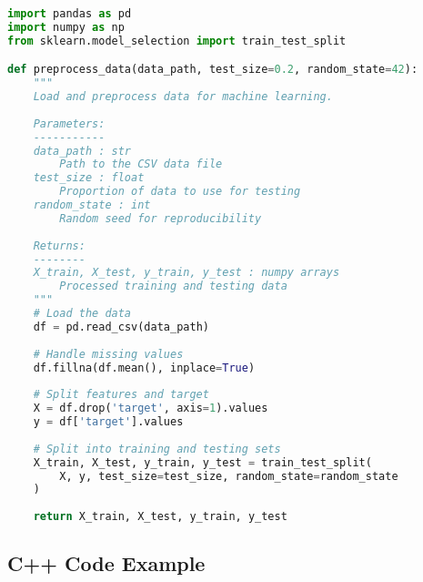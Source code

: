 \documentclass[a4paper,11pt]{article}
\begin{document}
\begin{lstlisting}[language=Python, caption=Data Processing in Python, label=lst:python]
import pandas as pd
import numpy as np
from sklearn.model_selection import train_test_split

def preprocess_data(data_path, test_size=0.2, random_state=42):
    """
    Load and preprocess data for machine learning.
    
    Parameters:
    -----------
    data_path : str
        Path to the CSV data file
    test_size : float
        Proportion of data to use for testing
    random_state : int
        Random seed for reproducibility
        
    Returns:
    --------
    X_train, X_test, y_train, y_test : numpy arrays
        Processed training and testing data
    """
    # Load the data
    df = pd.read_csv(data_path)
    
    # Handle missing values
    df.fillna(df.mean(), inplace=True)
    
    # Split features and target
    X = df.drop('target', axis=1).values
    y = df['target'].values
    
    # Split into training and testing sets
    X_train, X_test, y_train, y_test = train_test_split(
        X, y, test_size=test_size, random_state=random_state
    )
    
    return X_train, X_test, y_train, y_test
\end{lstlisting}

\subsection{C++ Code Example}
\end{document}
